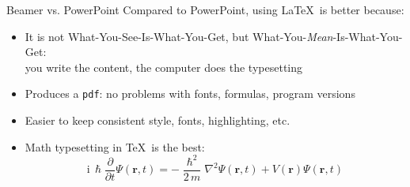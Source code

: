 \documentclass{beamer}
\begin{document}
\begin{frame}{Beamer vs. PowerPoint}
    Compared to PowerPoint, using \LaTeX\ is better because:
    \begin{itemize}
        \item It is not What-You-See-Is-What-You-Get, but
              What-You-\emph{Mean}-Is-What-You-Get:\\
              you write the content, the computer does the typesetting
        \item Produces a \texttt{pdf}: no problems with fonts, formulas,
              program versions
        \item Easier to keep consistent style, fonts, highlighting, etc.
        \item Math typesetting in \TeX\ is the best:
              \begin{equation*}
                  \mathrm{i}\,\hslash\frac{\partial}{\partial t} \Psi(\mathbf{r},t) =
                  -\frac{\hslash^2}{2\,m}\nabla^2\Psi(\mathbf{r},t)
                  + V(\mathbf{r})\Psi(\mathbf{r},t)
              \end{equation*}

    \end{itemize}
\end{frame}

\end{document}
